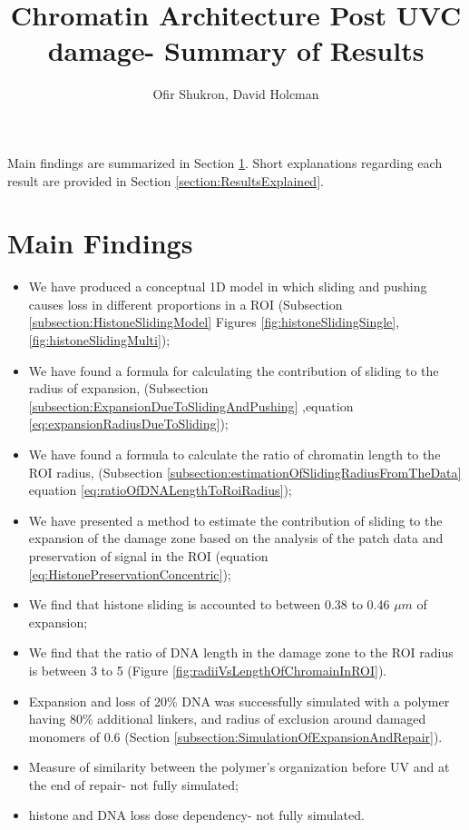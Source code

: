 \documentclass[12pt]{report}
\begin{document}
		\title{Chromatin Architecture Post UVC damage- Summary of Results}	
		\author{Ofir Shukron, David Holcman}	
		\maketitle
		
		Main findings are summarized in Section \ref{section:MainFindings}. Short explanations regarding each result are provided in Section \ref{section:ResultsExplained}.
		
	\section{Main Findings}\label{section:MainFindings}
		\begin{itemize}
            \item We have produced a conceptual 1D model in which sliding and pushing causes loss in different proportions in a ROI (Subsection \ref{subsection:HistoneSlidingModel} Figures \ref{fig:histoneSlidingSingle}, \ref{fig:histoneSlidingMulti});
			\item We have found a formula for calculating the contribution of sliding to the radius of expansion, (Subsection \ref{subsection:ExpansionDueToSlidingAndPushing} ,equation \ref{eq:expansionRadiusDueToSliding});			
			\item We have found a formula to calculate the ratio of chromatin length to the ROI radius, (Subsection \ref{subsection:estimationOfSlidingRadiusFromTheData} equation \ref{eq:ratioOfDNALengthToRoiRadius});
			\item We have presented a method to estimate the contribution of sliding to the expansion of the damage zone based on the analysis of the patch data and preservation of signal in the ROI (equation \ref{eq:HistonePreservationConcentric});
			\item We find that histone sliding is accounted to between 0.38 to 0.46 $\mu m$ of expansion;
			\item We find that the ratio of DNA length in the damage zone to the ROI radius is between 3 to 5 (Figure \ref{fig:radiiVsLengthOfChromainInROI}). 
			\item Expansion and loss of 20\% DNA was successfully simulated with a polymer having 80\% additional linkers, and radius of exclusion around damaged monomers of 0.6 (Section \ref{subsection:SimulationOfExpansionAndRepair}). 
			\item Measure of similarity between the polymer's organization before UV and at the end of repair- not fully simulated;
			\item histone and DNA loss dose dependency- not fully simulated.
		\end{itemize}
\end{document}
